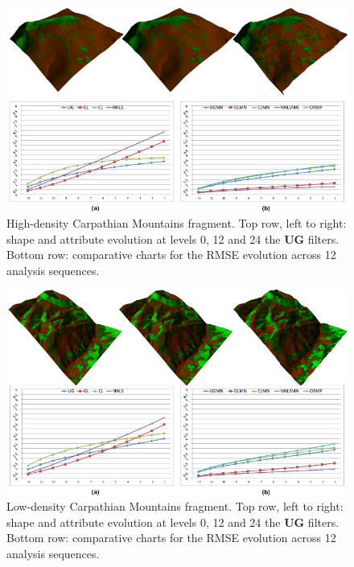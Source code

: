 \documentclass[graybox]{svmult}
\begin{document}
	\begin{figure}[!htbp]
		\centering
		\includegraphics{fundata_lod_rmse.pdf}
		
		\caption{\label{fig_cds:fundata_lod_rmse}%
			High-density Carpathian Mountains fragment.  Top row, left to right: shape and attribute evolution at levels 0, 12 and 24 the \textbf{UG} filters. Bottom row: comparative charts for the RMSE evolution across 12 analysis sequences. }
	\end{figure}
	
	\begin{figure}[!htbp]
		\centering
		\includegraphics{iezer_lod_rmse.pdf}
		
		\caption{\label{fig_cds:iezer_lod_rmse}%
			Low-density Carpathian Mountains fragment.  Top row, left to right: shape and attribute evolution at levels 0, 12 and 24 the \textbf{UG} filters. Bottom row: comparative charts for the RMSE evolution across 12 analysis sequences. }
	\end{figure}
	
\end{document}
